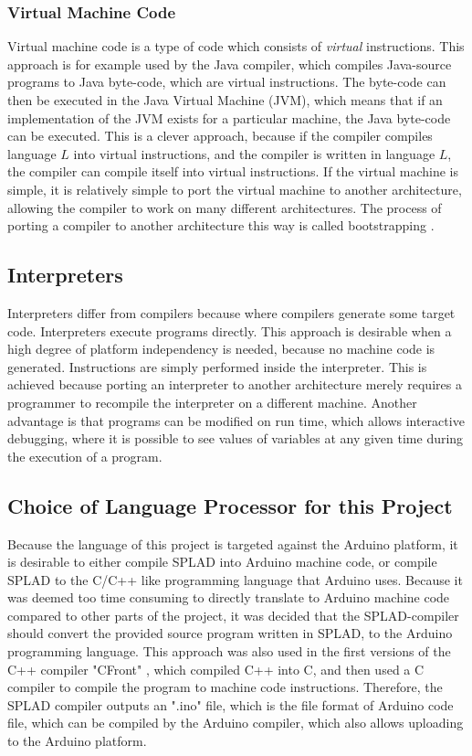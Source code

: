 \subsubsection{Virtual Machine Code} 
Virtual machine code is a type of code which consists of \emph{virtual} instructions. This approach is for example used by the Java compiler, which compiles Java-source programs to Java byte-code, which are virtual instructions. The byte-code can then be executed in the Java Virtual Machine (JVM), which means that if an implementation of the JVM exists for a particular machine, the Java byte-code can be executed. This is a clever approach, because if the compiler compiles language $L$ into virtual instructions, and the compiler is written in language $L$, the compiler can compile itself into virtual instructions. If the virtual machine is simple, it is relatively simple to port the virtual machine to another architecture, allowing the compiler to work on many different architectures. The process of porting a compiler to another architecture this way is called bootstrapping \citep{CraftingACompiler}. 

\subsection{Interpreters}
Interpreters differ from compilers because where compilers generate some target code. Interpreters execute programs directly. This approach is desirable when a high degree of platform independency is needed, because no machine code is generated. Instructions are simply performed inside the interpreter. This is achieved because porting an interpreter to another architecture merely requires a programmer to recompile the interpreter on a different machine. Another advantage is that programs can be modified on run time, which allows interactive debugging, where it is possible to see values of variables at any given time during the execution of a program. 

\subsection{Choice of Language Processor for this Project}
Because the language of this project is targeted against the Arduino platform, it is desirable to either compile SPLAD into Arduino machine code, or compile SPLAD to the C/C++ like programming language that Arduino uses. Because it was deemed too time consuming to directly translate to Arduino machine code compared to other parts of the project, it was decided that the SPLAD-compiler should convert the provided source program written in SPLAD, to the Arduino programming language. This approach was also used in the first versions of the C++ compiler "CFront" \citep{sebesta}, which compiled C++ into C, and then used a C compiler to compile the program to machine code instructions. Therefore, the SPLAD compiler outputs an  ".ino" file, which is the file format of Arduino code file, which can be compiled by the Arduino compiler, which also allows uploading to the Arduino platform. 